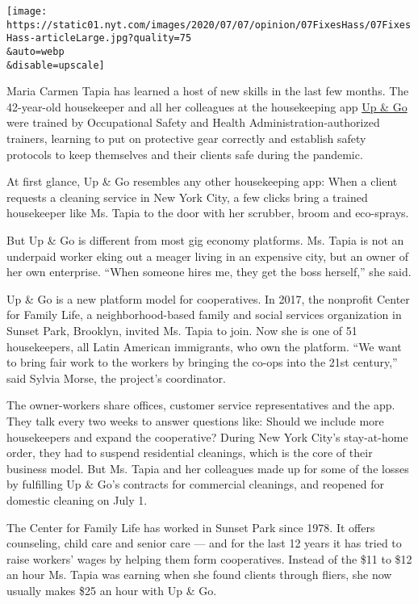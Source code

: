 \texttt{[image: https://static01.nyt.com/images/2020/07/07/opinion/07FixesHass/07FixesHass-articleLarge.jpg?quality=75\\\&auto=webp\\\&disable=upscale]}

Maria Carmen Tapia has learned a host of new skills in the last few
months. The 42-year-old housekeeper and all her colleagues at the
housekeeping app \href{https://www.upandgo.coop/}{Up \& Go} were trained
by Occupational Safety and Health Administration-authorized trainers,
learning to put on protective gear correctly and establish safety
protocols to keep themselves and their clients safe during the pandemic.

At first glance, Up \& Go resembles any other housekeeping app: When a
client requests a cleaning service in New York City, a few clicks bring
a trained housekeeper like Ms. Tapia to the door with her scrubber,
broom and eco-sprays.

But Up \& Go is different from most gig economy platforms. Ms. Tapia is
not an underpaid worker eking out a meager living in an expensive city,
but an owner of her own enterprise. ``When someone hires me, they get
the boss herself,'' she said.

Up \& Go is a new platform model for cooperatives. In 2017, the
nonprofit Center for Family Life, a neighborhood-based family and social
services organization in Sunset Park, Brooklyn, invited Ms. Tapia to
join. Now she is one of 51 housekeepers, all Latin American immigrants,
who own the platform. ``We want to bring fair work to the workers by
bringing the co-ops into the 21st century,'' said Sylvia Morse, the
project's coordinator.

The owner-workers share offices, customer service representatives and
the app. They talk every two weeks to answer questions like: Should we
include more housekeepers and expand the cooperative? During New York
City's stay-at-home order, they had to suspend residential cleanings,
which is the core of their business model. But Ms. Tapia and her
colleagues made up for some of the losses by fulfilling Up \& Go's
contracts for commercial cleanings, and reopened for domestic cleaning
on July 1.

The Center for Family Life has worked in Sunset Park since 1978. It
offers counseling, child care and senior care --- and for the last 12
years it has tried to raise workers' wages by helping them form
cooperatives. Instead of the \$11 to \$12 an hour Ms. Tapia was earning
when she found clients through fliers, she now usually makes \$25 an
hour with Up \& Go.

